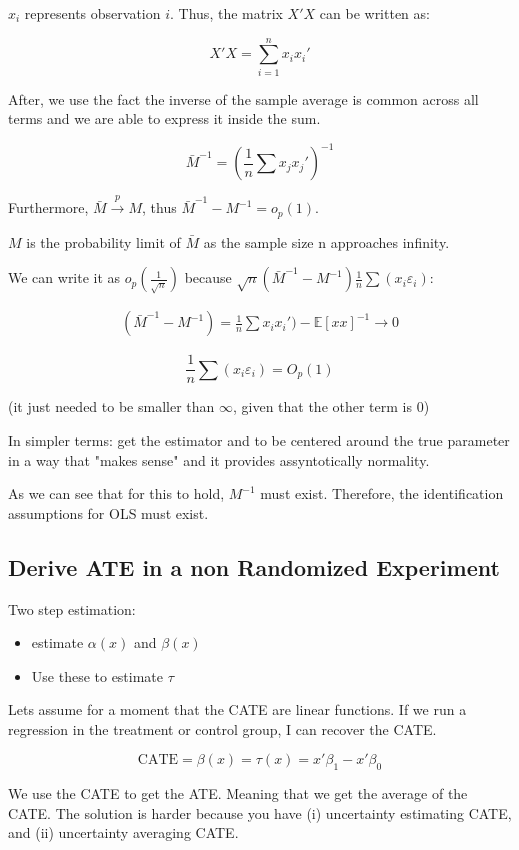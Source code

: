 \documentclass{article}
\begin{document}
$x_i$ represents observation $i$. Thus, the matrix $X'X$ can be written as:

$$
X'X = \sum_{i=1}^n x_i x_i'
$$

After, we use the fact the inverse of the sample average is common across all terms and we are able to express it inside the sum.

$$
\bar{M}^{-1} = \left( \frac{1}{n} \sum x_j x_j ' \right)^{-1} 
$$

Furthermore, \(\bar{M} \xrightarrow{p} M\), thus $\bar{M}^{-1} - M^{-1} = o_p(1)$.

$M$ is the probability limit of $\bar{M}$ as the sample size n approaches infinity.

We can write it as $o_p\left( \frac{1}{\sqrt{n}} \right)$ because $\sqrt{n} ({\bar{M}}^{-1} - {M}^{-1}) \frac{1}{n} \sum (x_i \varepsilon_i)$:

\begin{align*}
    ({\bar{M}}^{-1} - {M}^{-1}) = \frac{1}{n} \sum x_i x_i') - \mathbb{E}[x x]^{-1} \to 0
\end{align*}

$$
\frac{1}{n} \sum (x_i \varepsilon_i) = O_p(1)
$$

(it just needed to be smaller than $\infty$, given that the other term is 0)

In simpler terms: get the estimator and to be centered around the true parameter in a way that "makes sense" and it provides assyntotically normality.

As we can see that for this to hold, ${M}^{-1}$ must exist. Therefore, the identification assumptions for OLS must exist.

\subsection{Derive ATE in a non Randomized Experiment}
Two step estimation:
\begin{itemize}
    \item estimate $\alpha(x)$ and $\beta(x)$
    \item Use these to estimate $\tau$
\end{itemize}

Lets assume for a moment that the CATE are linear functions. If we run a regression in the treatment or control group, I can recover the CATE.

$$
\text{CATE} = \beta(x) = \tau(x) = x'\beta_1 - x'\beta_0
$$

We use the CATE to get the ATE. Meaning that we get the average of the CATE. The solution is harder because you have (i) uncertainty estimating CATE, and (ii) uncertainty averaging CATE.
\end{document}
